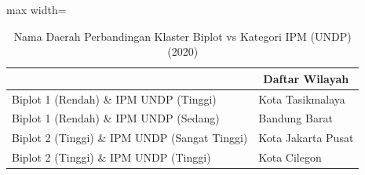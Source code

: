 \begin{table}[H]
\centering
\caption{Nama Daerah Perbandingan Klaster Biplot vs Kategori IPM (UNDP) (2020)} \label{tab:sample1crossname2020}
\begin{adjustbox}{max width=\textwidth}
\begin{tabular}{|>{\centering\arraybackslash}p{4cm}|p{10cm}|}
\hline
\multicolumn{1}{|c|}{\textbf{Kategori}} & \multicolumn{1}{c|}{\textbf{Daftar Wilayah}} \\
\hline
Biplot 1 (Rendah) \& IPM UNDP (Tinggi) & Kota Tasikmalaya \\
\hline
Biplot 1 (Rendah) \& IPM UNDP (Sedang) & Bandung Barat \\
\hline
Biplot 2 (Tinggi) \& IPM UNDP (Sangat Tinggi) & Kota Jakarta Pusat \\
\hline
Biplot 2 (Tinggi) \& IPM UNDP (Tinggi) & Kota Cilegon \\
\hline
\end{tabular}
\end{adjustbox}
\end{table}